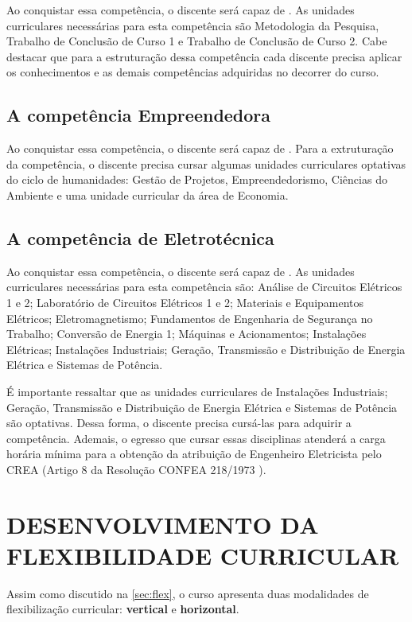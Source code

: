Ao conquistar essa competência, o discente será capaz de \textbf{\compCien}. As unidades curriculares necessárias para esta competência são Metodologia da Pesquisa, Trabalho de Conclusão de Curso 1 e Trabalho de Conclusão de Curso 2. Cabe destacar que para a estruturação dessa competência cada discente precisa aplicar os conhecimentos e as demais competências adquiridas no decorrer do curso.

\subsection{A competência Empreendedora}

Ao conquistar essa competência, o discente será capaz de \textbf{\compEmp}. Para a extruturação da competência, o discente precisa cursar algumas unidades curriculares optativas do ciclo de humanidades: Gestão de Projetos, Empreendedorismo, Ciências do Ambiente e uma unidade curricular da área de Economia.

\subsection{A competência de Eletrotécnica}

Ao conquistar essa competência, o discente será capaz de \textbf{\compEle}. As unidades curriculares necessárias para esta competência são: Análise de Circuitos Elétricos 1 e 2; Laboratório de Circuitos Elétricos 1 e 2; Materiais e Equipamentos Elétricos; Eletromagnetismo; Fundamentos de Engenharia de Segurança no Trabalho; Conversão de Energia 1; Máquinas e Acionamentos; Instalações Elétricas; Instalações Industriais; Geração, Transmissão e Distribuição de Energia Elétrica e Sistemas de Potência.

É importante ressaltar que as unidades curriculares de Instalações Industriais; Geração, Transmissão e Distribuição de Energia Elétrica e Sistemas de Potência são optativas. Dessa forma, o discente precisa cursá-las para adquirir a competência. Ademais, o egresso que cursar essas disciplinas atenderá a carga horária mínima para a obtenção da atribuição de Engenheiro Eletricista pelo CREA (Artigo 8\textordmasculine{} da Resolução CONFEA 218/1973 \cite{confea1973}).

\section{DESENVOLVIMENTO DA FLEXIBILIDADE CURRICULAR}

Assim como discutido na \autoref{sec:flex}, o curso apresenta duas modalidades de flexibilização curricular: \textbf{vertical} e \textbf{horizontal}. 

